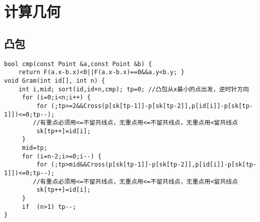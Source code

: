 \documentclass[landscape,a4paper]{article}
\begin{document}
\section{计算几何}

\subsection{凸包}
\begin{lstlisting}
bool cmp(const Point &a,const Point &b) {
	return F(a.x-b.x)<0||F(a.x-b.x)==0&&a.y<b.y; }
void Gram(int id[], int n) {
	int i,mid; sort(id,id+n,cmp); tp=0; //凸包从x最小的点出发，逆时针方向
     for (i=0;i<n;i++) {
         for (;tp>=2&&Cross(p[sk[tp-1]]-p[sk[tp-2]],p[id[i]]-p[sk[tp-1]])<=0;tp--); 
		//有重点必须用<=不留共线点，无重点用<=不留共线点，无重点用<留共线点
         sk[tp++]=id[i];
     }
     mid=tp;
     for (i=n-2;i>=0;i--) {
         for (;tp>mid&&Cross(p[sk[tp-1]]-p[sk[tp-2]],p[id[i]]-p[sk[tp-1]])<=0;tp--); 
		//有重点必须用<=不留共线点，无重点用<=不留共线点，无重点用<留共线点
         sk[tp++]=id[i];
     }
     if  (n>1) tp--;
}
\end{lstlisting}
\end{document}
